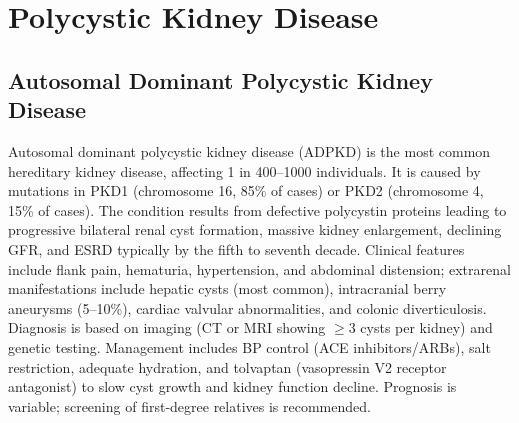 \section{Polycystic Kidney Disease}








\label{sec:Polycystic Kidney Disease}

\subsection{Autosomal Dominant Polycystic Kidney Disease}
\label{sec:Autosomal Dominant Polycystic Kidney Disease}
Autosomal dominant polycystic kidney disease (ADPKD) is the most common hereditary kidney disease, affecting 1 in 400--1000 individuals. It is caused by mutations in PKD1 (chromosome 16, 85\% of cases) or PKD2 (chromosome 4, 15\% of cases). The condition results from defective polycystin proteins leading to progressive bilateral renal cyst formation, massive kidney enlargement, declining GFR, and ESRD typically by the fifth to seventh decade. Clinical features include flank pain, hematuria, hypertension, and abdominal distension; extrarenal manifestations include hepatic cysts (most common), intracranial berry aneurysms (5--10\%), cardiac valvular abnormalities, and colonic diverticulosis. Diagnosis is based on imaging (CT or MRI showing $\geq$3 cysts per kidney) and genetic testing. Management includes BP control (ACE inhibitors/ARBs), salt restriction, adequate hydration, and tolvaptan (vasopressin V2 receptor antagonist) to slow cyst growth and kidney function decline. Prognosis is variable; screening of first-degree relatives is recommended.

